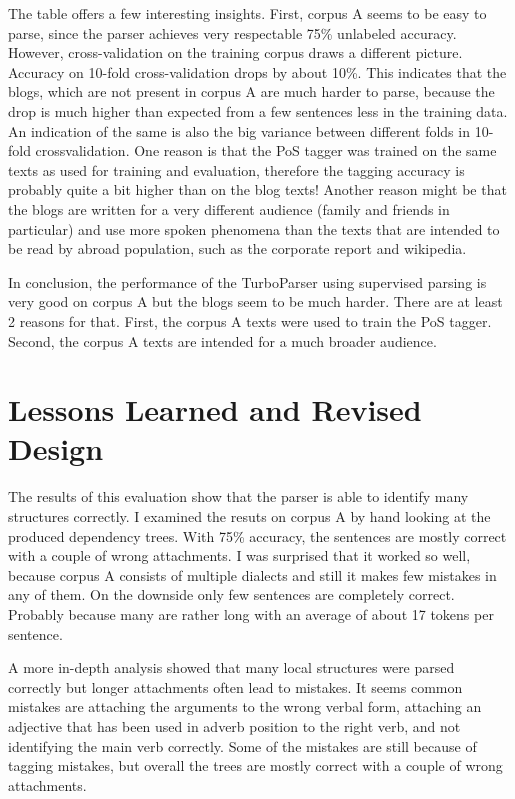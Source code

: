 \documentclass[11pt,letterpaper, covington]{article}
\begin{document}
The table offers a few interesting insights. First, corpus A seems to be easy to parse, since the parser achieves very respectable 75\% unlabeled accuracy. However, cross-validation on the training corpus draws a different picture. Accuracy on 10-fold cross-validation drops by about 10\%. This indicates that the blogs, which are not present in corpus A are much harder to parse, because the drop is much higher than expected from a few sentences less in the training data. An indication of the same is also the big variance between different folds in 10-fold crossvalidation. One reason is that the PoS tagger was trained on the same texts as used for training and evaluation, therefore the tagging accuracy is probably quite a bit higher than on the blog texts! Another reason might be that the blogs are written for a very different audience (family and friends in particular) and use more spoken phenomena than the texts that are intended to be read by abroad population, such as the corporate report and wikipedia.

In conclusion, the performance of the TurboParser using supervised parsing is very good on corpus A but the blogs seem to be much harder. There are at least 2 reasons for that. First, the corpus A texts were used to train the PoS tagger. Second, the corpus A texts are intended for a much broader audience. 

\section{Lessons Learned and Revised Design}

The results of this evaluation show that the parser is able to identify many structures correctly. I examined the resuts on corpus A by hand looking at the produced dependency trees. With 75\% accuracy, the sentences are mostly correct with a couple of wrong attachments. I was surprised that it worked so well, because corpus A consists of multiple dialects and still it makes few mistakes in any of them. On the downside only few sentences are completely correct. Probably because many are rather long with an average of about 17 tokens per sentence. 

A more in-depth analysis showed that many local structures were parsed correctly but longer attachments often lead to mistakes. It seems common mistakes are attaching the arguments to the wrong verbal form, attaching an adjective that has been used in adverb position to the right verb, and not identifying the main verb correctly. Some of the mistakes are still because of tagging mistakes, but overall the trees are mostly correct with a couple of wrong attachments. 
\end{document}
